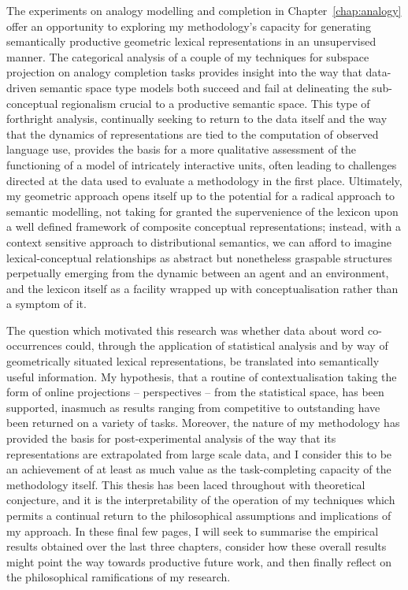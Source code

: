 The experiments on analogy modelling and completion in Chapter~\ref{chap:analogy} offer an opportunity to exploring my methodology's capacity for generating semantically productive geometric lexical representations in an unsupervised manner.  The categorical analysis of a couple of my techniques for subspace projection on analogy completion tasks provides insight into the way that data-driven semantic space type models both succeed and fail at delineating the sub-conceptual regionalism crucial to a productive semantic space.  This type of forthright analysis, continually seeking to return to the data itself and the way that the dynamics of representations are tied to the computation of observed language use, provides the basis for a more qualitative assessment of the functioning of a model of intricately interactive units, often leading to challenges directed at the data used to evaluate a methodology in the first place.  Ultimately, my geometric approach opens itself up to the potential for a radical approach to semantic modelling, not taking for granted the supervenience of the lexicon upon a well defined framework of composite conceptual representations; instead, with a context sensitive approach to distributional semantics, we can afford to imagine lexical-conceptual relationships as abstract but nonetheless graspable structures perpetually emerging from the dynamic between an agent and an environment, and the lexicon itself as a facility wrapped up with conceptualisation rather than a symptom of it.

The question which motivated this research was whether data about word co-occurrences could, through the application of statistical analysis and by way of geometrically situated lexical representations, be translated into semantically useful information.  My hypothesis, that a routine of contextualisation taking the form of online projections -- perspectives -- from the statistical space, has been supported, inasmuch as results ranging from competitive to outstanding have been returned on a variety of tasks.  Moreover, the nature of my methodology has provided the basis for post-experimental analysis of the way that its representations are extrapolated from large scale data, and I consider this to be an achievement of at least as much value as the task-completing capacity of the methodology itself.  This thesis has been laced throughout with theoretical conjecture, and it is the interpretability of the operation of my techniques which permits a continual return to the philosophical assumptions and implications of my approach.  In these final few pages, I will seek to summarise the empirical results obtained over the last three chapters, consider how these overall results might point the way towards productive future work, and then finally reflect on the philosophical ramifications of my research.

